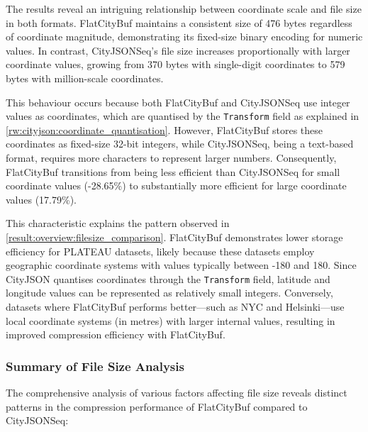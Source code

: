 The results reveal an intriguing relationship between coordinate scale and file size in both formats. FlatCityBuf maintains a consistent size of 476 bytes regardless of coordinate magnitude, demonstrating its fixed-size binary encoding for numeric values. In contrast, CityJSONSeq's file size increases proportionally with larger coordinate values, growing from 370 bytes with single-digit coordinates to 579 bytes with million-scale coordinates.

This behaviour occurs because both FlatCityBuf and CityJSONSeq use integer values as coordinates, which are quantised by the \texttt{Transform} field as explained in \autoref{rw:cityjson:coordinate_quantisation}. However, FlatCityBuf stores these coordinates as fixed-size 32-bit integers, while CityJSONSeq, being a text-based format, requires more characters to represent larger numbers. Consequently, FlatCityBuf transitions from being less efficient than CityJSONSeq for small coordinate values (-28.65\%) to substantially more efficient for large coordinate values (17.79\%).

This characteristic explains the pattern observed in \autoref{result:overview:filesize_comparison}. FlatCityBuf demonstrates lower storage efficiency for PLATEAU datasets, likely because these datasets employ geographic coordinate systems with values typically between -180 and 180. Since CityJSON quantises coordinates through the \texttt{Transform} field, latitude and longitude values can be represented as relatively small integers. Conversely, datasets where FlatCityBuf performs better—such as NYC and Helsinki—use local coordinate systems (in metres) with larger internal values, resulting in improved compression efficiency with FlatCityBuf.

\subsubsection{Summary of File Size Analysis}
\label{result:overview:analysis_of_file_size_results:summary}

The comprehensive analysis of various factors affecting file size reveals distinct patterns in the compression performance of FlatCityBuf compared to CityJSONSeq:


